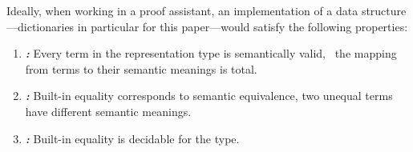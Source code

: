 



Ideally, when working in a proof assistant, an implementation of a data structure---dictionaries in particular for this paper---would satisfy the following properties:

\newcommand{\designGoal}[1]
  {\textbf{\emph{#1:}}}

\begin{enumerate}

\item
%
\designGoal{\SemTot}
%
Every term in the representation type is semantically valid, \ie{}~the mapping from terms to their semantic meanings is total.

\item
%
\designGoal{\SemInj}
%
Built-in equality corresponds to semantic equivalence, \ie{} two unequal terms have different semantic meanings.

\item
%
\designGoal{\EqDec}
%
Built-in equality is decidable for the type.

\end{enumerate}

